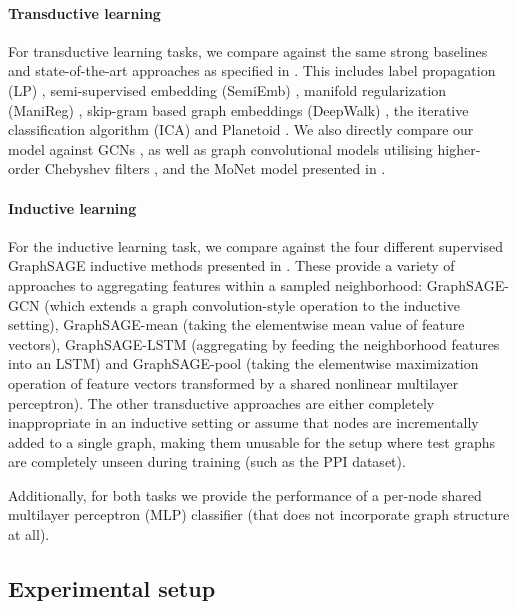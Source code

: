 \documentclass{article} \usepackage{iclr2018_conference,times}
\begin{document}
\paragraph{Transductive learning}
For transductive learning tasks, we compare against the same strong baselines and state-of-the-art approaches as specified in \cite{kipf2016semi}. This includes label propagation (LP) \citep{zhu2003semi}, semi-supervised embedding (SemiEmb) \citep{weston2012deep}, manifold regularization (ManiReg) \citep{belkin2006manifold}, skip-gram based graph embeddings (DeepWalk) \citep{perozzi2014deepwalk}, the iterative classification algorithm (ICA) \citep{lu2003link} and Planetoid \citep{yang2016revisiting}. We also directly compare our model against GCNs \citep{kipf2016semi}, as well as graph convolutional models utilising higher-order Chebyshev filters \citep{defferrard2016convolutional}, and the MoNet model presented in \cite{monti2016geometric}.

\paragraph{Inductive learning}
For the inductive learning task, we compare against the four different supervised GraphSAGE inductive methods presented in \cite{hamilton2017inductive}. These provide a variety of approaches to aggregating features within a sampled neighborhood: GraphSAGE-GCN (which extends a graph convolution-style operation to the inductive setting), GraphSAGE-mean (taking the elementwise mean value of feature vectors), GraphSAGE-LSTM (aggregating by feeding the neighborhood features into an LSTM) and GraphSAGE-pool (taking the elementwise maximization operation of feature vectors transformed by a shared nonlinear multilayer perceptron). The other transductive approaches are either completely inappropriate in an inductive setting or assume that nodes are incrementally added to a single graph, making them unusable for the setup where test graphs are completely unseen during training (such as the PPI dataset).

Additionally, for both tasks we provide the performance of a per-node shared multilayer perceptron (MLP) classifier (that does not incorporate graph structure at all).

\subsection{Experimental setup}
\end{document}
